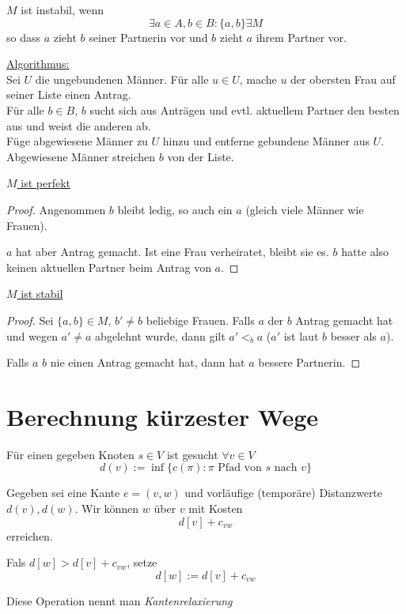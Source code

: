 \documentclass{mycourse}
\begin{document}
\begin{df}
$M$ ist instabil, wenn
\[
\exists a\in A, b\in B: \{a,b\} \exists M
\]
so dass $a$ zieht $b$ seiner Partnerin vor und $b$ zieht $a$ ihrem Partner vor.
\end{df}

\underline{Algorithmus:}\\
Sei $U$ die ungebundenen Männer.
Für alle $u\in U$, mache $u$ der obersten Frau auf seiner Liste einen Antrag.\\
Für alle $b\in B$, $b$ sucht sich aus Anträgen und evtl. aktuellem Partner den besten aus und weist die anderen ab.\\
Füge abgewiesene Männer zu $U$ hinzu und entferne gebundene Männer aus $U$.\\
Abgewiesene Männer streichen $b$ von der Liste.

\underline{$M$ ist perfekt}\\
\begin{proof}
	Angenommen $b$ bleibt ledig, so auch ein $a$ (gleich viele Männer wie Frauen).

$a$ hat aber Antrag gemacht.
Ist eine Frau verheiratet, bleibt sie es.
$b$ hatte also keinen aktuellen Partner beim Antrag von $a$.
\end{proof}

\underline{$M$ ist stabil}\\
\begin{proof}
Sei $\{a,b\}\in M$, $b'\neq b$ beliebige Frauen.
Falls $a$ der $b$ Antrag gemacht hat und wegen $a'\neq a$ abgelehnt wurde, dann gilt
$a'<_b a$ ($a'$ ist laut $b$ besser als $a$).

Falls $a$ $b$ nie einen Antrag gemacht hat, dann hat $a$ bessere Partnerin.
\end{proof}

\section{Berechnung kürzester Wege}

Für einen gegeben Knoten $s\in V$ ist gesucht $\forall v\in V$
\[
d(v) :=  \inf \{c(\pi):\pi \text{ Pfad von $s$ nach $v$}\}
\]


\begin{df}[Kantenrelaxierung]
Gegeben sei eine Kante $e=(v,w)$ und vorläufige (temporäre) Distanzwerte $d(v), d(w)$.
Wir können $w$ über $v$ mit Kosten
\[
d[v]+c_{vw}
\]
erreichen.

Fals $d[w] > d[v] + c_{vw}$, setze
\[
d[w] := d[v] + c_{vw}
\]

Diese Operation nennt man \emph{Kantenrelaxierung}
\end{df}
\end{document}
